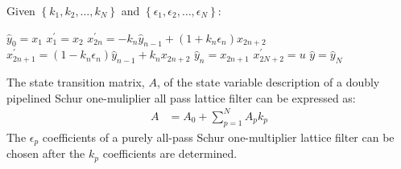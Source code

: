 \documentclass[a4paper,twoside,10pt,english]{article}
\begin{document}
\begin{algorithm}[!hbp]
Given $\left\{k_{1},k_{2},\hdots,k_{N}\right\}$ and
$\left\{\epsilon_{1},\epsilon_{2},\hdots,\epsilon_{N}\right\}$:
\begin{algorithmic}
\State $\hat{y}_{0} = x_{1}$
\State $x_{1}^{\prime} = x_{2}$  
\State $x_{2n}^{\prime}=-k_{n}\hat{y}_{n-1}+\left(1+k_{n}\epsilon_{n}\right)x_{2n+2}$
\State $x_{2n+1}^{\prime}=\left(1-k_{n}\epsilon_{n}\right)\hat{y}_{n-1}+k_{n}x_{2n+2}$
\State $\hat{y}_{n} = x_{2n+1}$
\EndFor
\State $x_{2N+2}^{\prime}=u$
\State $\hat{y}=\hat{y}_{N}$
\end{algorithmic}
\caption{Construction of a state variable description of the all-pass
  doubly-pipelined Schur one-multiplier lattice filter.}
\label{alg:Construction-state-variable-all-pass-doubly-pipelined-One-Multiplier-lattice}
\end{algorithm}

The state transition matrix, $A$, of the state variable description of a doubly
pipelined Schur one-muliplier all pass lattice filter can be expressed as:
\begin{align*}
  A &= A_{0}+\sum_{p=1}^{N}A_{p}k_{p}
\end{align*}
The $\epsilon_{p}$ coefficients of a purely all-pass Schur one-multiplier lattice
filter can be chosen after the $k_{p}$ coefficients are determined.
\end{document}
